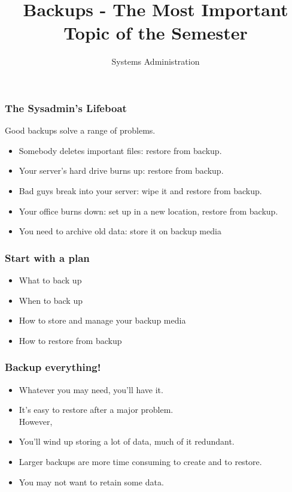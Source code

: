 \documentclass[10pt]{beamer}
\title{Backups - The Most Important Topic of the Semester}
\author[IN719]{Systems Administration}
\institute[Otago Polytechnic]{
  Otago Polytechnic \\
  Dunedin, New Zealand \\
}
\date{}
\begin{document}
\begin{frame}[plain]
  \titlepage
\end{frame}

\begin{frame}
  \frametitle{The Sysadmin's Lifeboat}
 
Good backups solve a range of problems.

\begin{itemize}
\item Somebody deletes important files:  restore from backup.
\item Your server's hard drive burns up:  restore from backup.
\item Bad guys break into your server:  wipe it and restore from backup.
\item Your office burns down: set up in a new location, restore from backup.
\item You need to archive old data: store it on backup media
\end{itemize}
\end{frame}

\begin{frame}
  \frametitle{Start with a plan}
 

\begin{itemize}
\item What to back up
\item When to back up
\item How to store and manage your backup media
\item How to restore from backup
\end{itemize}

\end{frame}

\begin{frame}
  \frametitle{Backup everything!}
 

\begin{itemize}
\item Whatever you may need, you'll have it.
\item It's easy to restore after a major problem. \\
       However,
\item You'll wind up storing a lot of data, much of it redundant.
\item Larger backups are more time consuming to create and to restore.
\item You may not want to retain some data.
\end{itemize}
\end{frame}
\end{document}
